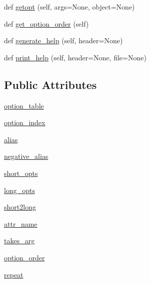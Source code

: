 \begin{DoxyCompactItemize}
\item 
def \hyperlink{classsetuptools_1_1__distutils_1_1fancy__getopt_1_1FancyGetopt_a1fc0fc155046e8c9aa56d6e5a4258b43}{getopt} (self, args=None, object=None)
\item 
def \hyperlink{classsetuptools_1_1__distutils_1_1fancy__getopt_1_1FancyGetopt_a080bca8d9edee4aa7cd7da4502fae610}{get\+\_\+option\+\_\+order} (self)
\item 
def \hyperlink{classsetuptools_1_1__distutils_1_1fancy__getopt_1_1FancyGetopt_a9729438817d9751a3b08f5b6060477c7}{generate\+\_\+help} (self, header=None)
\item 
def \hyperlink{classsetuptools_1_1__distutils_1_1fancy__getopt_1_1FancyGetopt_a1af95984a750e91da487a6cd0aecd5c8}{print\+\_\+help} (self, header=None, file=None)
\end{DoxyCompactItemize}
\subsection*{Public Attributes}
\begin{DoxyCompactItemize}
\item 
\hyperlink{classsetuptools_1_1__distutils_1_1fancy__getopt_1_1FancyGetopt_ab4341d9895b8b93f504df3dea529c456}{option\+\_\+table}
\item 
\hyperlink{classsetuptools_1_1__distutils_1_1fancy__getopt_1_1FancyGetopt_ad32c2fc606bffd0e4958187dc5810f1a}{option\+\_\+index}
\item 
\hyperlink{classsetuptools_1_1__distutils_1_1fancy__getopt_1_1FancyGetopt_a1b0493ab3037d6f1dbc4e6c41eeb4e67}{alias}
\item 
\hyperlink{classsetuptools_1_1__distutils_1_1fancy__getopt_1_1FancyGetopt_a51b78fe538db39a624a7ef1934671959}{negative\+\_\+alias}
\item 
\hyperlink{classsetuptools_1_1__distutils_1_1fancy__getopt_1_1FancyGetopt_a8c4f6aa9bb7711545ba80479a0199bb8}{short\+\_\+opts}
\item 
\hyperlink{classsetuptools_1_1__distutils_1_1fancy__getopt_1_1FancyGetopt_ae97d785ddc3a93bead82856ec3421754}{long\+\_\+opts}
\item 
\hyperlink{classsetuptools_1_1__distutils_1_1fancy__getopt_1_1FancyGetopt_addadb73905a9d4ff9737767f2fd5b426}{short2long}
\item 
\hyperlink{classsetuptools_1_1__distutils_1_1fancy__getopt_1_1FancyGetopt_a941dfbf3875a4694c8a24d6588d64c44}{attr\+\_\+name}
\item 
\hyperlink{classsetuptools_1_1__distutils_1_1fancy__getopt_1_1FancyGetopt_af2c1efe8420df17095501b2f594145d7}{takes\+\_\+arg}
\item 
\hyperlink{classsetuptools_1_1__distutils_1_1fancy__getopt_1_1FancyGetopt_a2e62a363cfc025e6a0c32ee1c5dc5a92}{option\+\_\+order}
\item 
\hyperlink{classsetuptools_1_1__distutils_1_1fancy__getopt_1_1FancyGetopt_aa7627145c14d77a3ee8e50e651d4fdd1}{repeat}
\end{DoxyCompactItemize}


